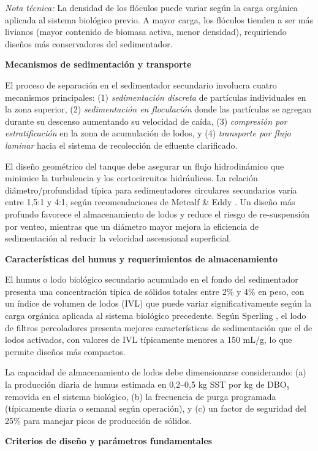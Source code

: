 \documentclass[12pt,a4paper]{article}
\begin{document}
\textit{Nota técnica:} La densidad de los flóculos puede variar según la carga orgánica aplicada al sistema biológico previo. A mayor carga, los flóculos tienden a ser más livianos (mayor contenido de biomasa activa, menor densidad), requiriendo diseños más conservadores del sedimentador.

\textbf{Mecanismos de sedimentación y transporte}

El proceso de separación en el sedimentador secundario involucra cuatro mecanismos principales: (1) \textit{sedimentación discreta} de partículas individuales en la zona superior, (2) \textit{sedimentación en floculación} donde las partículas se agregan durante su descenso aumentando su velocidad de caída, (3) \textit{compresión por estratificación} en la zona de acumulación de lodos, y (4) \textit{transporte por flujo laminar} hacia el sistema de recolección de efluente clarificado.

El diseño geométrico del tanque debe asegurar un flujo hidrodinámico que minimice la turbulencia y los cortocircuitos hidráulicos. La relación diámetro/profundidad típica para sedimentadores circulares secundarios varía entre 1,5:1 y 4:1, según recomendaciones de Metcalf \& Eddy \cite{metcalf2014}. Un diseño más profundo favorece el almacenamiento de lodos y reduce el riesgo de re-suspensión por venteo, mientras que un diámetro mayor mejora la eficiencia de sedimentación al reducir la velocidad ascensional superficial.

\textbf{Características del humus y requerimientos de almacenamiento}

El humus o lodo biológico secundario acumulado en el fondo del sedimentador presenta una concentración típica de sólidos totales entre 2\% y 4\% en peso, con un índice de volumen de lodos (IVL) que puede variar significativamente según la carga orgánica aplicada al sistema biológico precedente. Según Sperling \cite{sperling2007}, el lodo de filtros percoladores presenta mejores características de sedimentación que el de lodos activados, con valores de IVL típicamente menores a 150 mL/g, lo que permite diseños más compactos.

La capacidad de almacenamiento de lodos debe dimensionarse considerando: (a) la producción diaria de humus estimada en 0,2--0,5 kg SST por kg de DBO₅ removida en el sistema biológico, (b) la frecuencia de purga programada (típicamente diaria o semanal según operación), y (c) un factor de seguridad del 25\% para manejar picos de producción de sólidos.

\textbf{Criterios de diseño y parámetros fundamentales}
\end{document}
